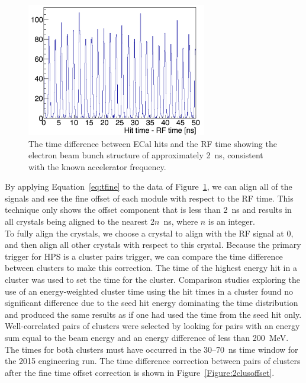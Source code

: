 \begin{figure}[htb]
  \centering
      \includegraphics[width=0.7\textwidth]{pics/performance/beamStructure.png}
  \caption[Time difference between ECal hits and RF time]{The time difference between ECal hits and the RF time showing the electron beam bunch structure of approximately 2~ns, consistent with the known accelerator frequency.}
  \label{Figure:beamBunch}
\end{figure}
By applying Equation~\eqref{eq:tfine} to the data of Figure~\ref{Figure:beamBunch}, we can align all of the signals and see the fine offset of each module with respect to the RF time. This technique only shows the offset component that is less than 2~ns and results in all crystals being aligned to the nearest 2$n$~ns, where $n$ is an integer.\\ 
\indent To fully align the crystals, we choose a crystal to align with the RF signal at 0, and then align all other crystals with respect to this crystal. Because the primary trigger for HPS is a cluster pairs trigger, we can compare the time difference between clusters to make this correction. The time of the highest energy hit in a cluster was used to set the time for the cluster. Comparison studies exploring the use of an energy-weighted cluster time using the hit times in a cluster found no significant difference due to the seed hit energy dominating the time distribution and produced the same results as if one had used the time from the seed hit only. Well-correlated pairs of clusters were selected by looking for pairs with an energy sum equal to the beam energy and an energy difference of less than 200~MeV. The times for both clusters must have occurred in the 30--70~ns time window for the 2015 engineering run. The time difference correction between pairs of clusters after the fine time offset correction is shown in Figure~\ref{Figure:2clusoffset}.

